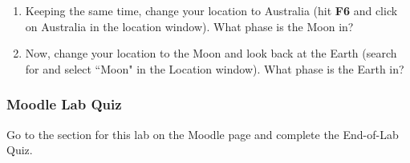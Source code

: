 \documentclass[main.tex]{subfiles}
\begin{document}
\begin{enumerate}
\item Keeping the same time, change your location to Australia (hit \textbf{F6} and click on Australia in the location window). What phase is the Moon in?

\item Now, change your location to the Moon and look back at the Earth (search for and select ``Moon" in the Location window). What phase is the Earth in?

\end{enumerate}

\subsubsection{Moodle Lab Quiz}
Go to the section for this lab on the Moodle page and complete the End-of-Lab Quiz.


\end{document}
